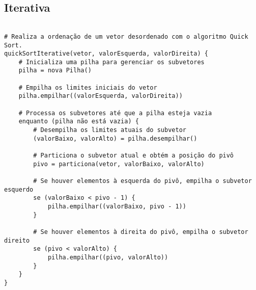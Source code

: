 \subsection{Iterativa}
\begin{verbatim}

# Realiza a ordenação de um vetor desordenado com o algoritmo Quick Sort.
quickSortIterative(vetor, valorEsquerda, valorDireita) {
    # Inicializa uma pilha para gerenciar os subvetores
    pilha = nova Pilha()
    
    # Empilha os limites iniciais do vetor
    pilha.empilhar((valorEsquerda, valorDireita))
    
    # Processa os subvetores até que a pilha esteja vazia
    enquanto (pilha não está vazia) {
        # Desempilha os limites atuais do subvetor
        (valorBaixo, valorAlto) = pilha.desempilhar()
        
        # Particiona o subvetor atual e obtém a posição do pivô
        pivo = particiona(vetor, valorBaixo, valorAlto)
        
        # Se houver elementos à esquerda do pivô, empilha o subvetor esquerdo
        se (valorBaixo < pivo - 1) {
            pilha.empilhar((valorBaixo, pivo - 1))
        }
        
        # Se houver elementos à direita do pivô, empilha o subvetor direito
        se (pivo < valorAlto) {
            pilha.empilhar((pivo, valorAlto))
        }
    }
}

\end{verbatim}
